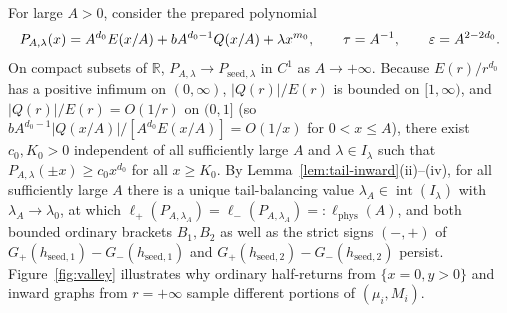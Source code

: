 For large $A>0$, consider the prepared polynomial
\begin{equation}\label{eq:prepared-poly}
  P_{A,\lambda}(x) = A^{d_0} E(x/A) + b A^{d_0-1} Q(x/A) + \lambda x^{m_0}, \qquad \tau = A^{-1}, \qquad \varepsilon = A^{2-2d_0}.
\end{equation}
On compact subsets of $\mathbb{R}$, $P_{A,\lambda}\to P_{\mathrm{seed},\lambda}$ in $C^1$ as
$A\to+\infty$. Because $E(r)/r^{d_0}$ has a positive infimum on $(0,\infty)$, $|Q(r)|/E(r)$ is bounded
on $[1,\infty)$, and $|Q(r)|/E(r)=O(1/r)$ on $(0,1]$ (so $bA^{d_0-1}|Q(x/A)|/[A^{d_0}E(x/A)]=O(1/x)$
for $0<x\le A$), there exist $c_0,K_0>0$ independent of all sufficiently large $A$ and $\lambda\in
I_\lambda$ such that $P_{A,\lambda}(\pm x)\ge c_0 x^{d_0}$ for all $x\ge K_0$. By
Lemma~\ref{lem:tail-inward}(ii)--(iv), for all sufficiently large $A$ there is a unique tail-balancing
value $\lambda_A\in\operatorname{int}(I_\lambda)$ with $\lambda_A\to\lambda_0$, at which
$\ell_+(P_{A,\lambda_A})=\ell_-(P_{A,\lambda_A})=:\ell_{\mathrm{phys}}(A)$, and both bounded ordinary
brackets $B_1,B_2$ as well as the strict signs $(-,+)$ of
$G_+(h_{\mathrm{seed},1})-G_-(h_{\mathrm{seed},1})$ and
$G_+(h_{\mathrm{seed},2})-G_-(h_{\mathrm{seed},2})$ persist. Figure~\ref{fig:valley} illustrates why
ordinary half-returns from $\{x=0,y>0\}$ and inward graphs from $r=+\infty$ sample different portions
of $(\mu_i,M_i)$.

